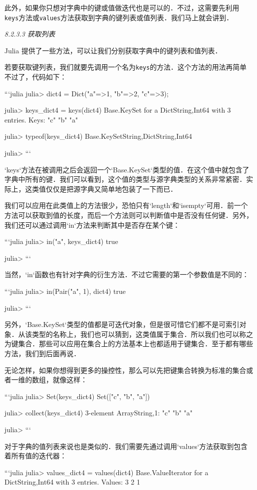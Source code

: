 此外，如果你只想对字典中的键或值做迭代也是可以的．不过，这需要先利用\verb|keys|方法或\verb|values|方法获取到字典的键列表或值列表．我们马上就会讲到．

\textsl{8.2.3.3 获取列表}

Julia 提供了一些方法，可以让我们分别获取字典中的键列表和值列表．

若要获取键列表，我们就要先调用一个名为\verb|keys|的方法．这个方法的用法再简单不过了，代码如下：

```julia
julia> dict4 = Dict("a"=>1, "b"=>2, "c"=>3);

julia> keys_dict4 = keys(dict4)
Base.KeySet for a Dict{String,Int64} with 3 entries. Keys:
  "c"
  "b"
  "a"

julia> typeof(keys_dict4)
Base.KeySet{String,Dict{String,Int64}}

julia> 
```

`keys`方法在被调用之后会返回一个`Base.KeySet`类型的值．在这个值中就包含了字典中所有的键．我们可以看到，这个值的类型与源字典类型的关系非常紧密．实际上，这类值仅仅是把源字典又简单地包装了一下而已．

我们可以应用在此类值上的方法很少，恐怕只有`length`和`isempty`可用．前一个方法可以获取到值的长度，而后一个方法则可以判断值中是否没有任何键．另外，我们还可以通过调用`in`方法来判断其中是否存在某个键：

```julia
julia> in("a", keys_dict4)
true

julia> 
```

当然，`in`函数也有针对字典的衍生方法．不过它需要的第一个参数值是不同的：

```julia
julia> in(Pair("a", 1), dict4)
true

julia> 
```

另外，`Base.KeySet`类型的值都是可迭代对象，但是很可惜它们都不是可索引对象．从该类型的名称上，我们也可以猜到，这类值属于集合．所以我们也可以称之为键集合．那些可以应用在集合上的方法基本上也都适用于键集合．至于都有哪些方法，我们到后面再说．

无论怎样，如果你想得到更多的操控性，那么可以先把键集合转换为标准的集合或者一维的数组，就像这样：

```julia
julia> Set(keys_dict4)
Set(["c", "b", "a"])

julia> collect(keys_dict4)
3-element Array{String,1}:
 "c"
 "b"
 "a"

julia> 
```

对于字典的值列表来说也是类似的．我们需要先通过调用`values`方法获取到包含着所有值的迭代器：

```julia
julia> values_dict4 = values(dict4)
Base.ValueIterator for a Dict{String,Int64} with 3 entries. Values:
  3
  2
  1


